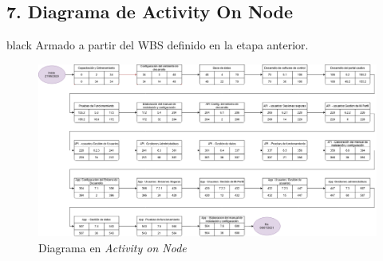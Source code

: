 \documentclass[11pt]{charter}
\begin{document}
\begin{landscape}
\section{7. Diagrama de Activity On Node}
\label{sec:AoN}

\begin{consigna}{black}
Armado a partir del WBS definido en la etapa anterior. 



\begin{figure}[htpb]
\centering 
\includegraphics[width=1.4\textwidth]{./Figuras/AoN.png}
\caption{Diagrama en \textit{Activity on Node}}
\label{fig:AoN}
\end{figure}


\end{consigna}

\end{landscape}
\end{document}
